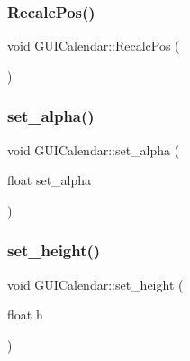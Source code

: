 \hypertarget{class_g_u_i_calendar_ac1678b2d98311a54578745c173868b72}{}\label{class_g_u_i_calendar_ac1678b2d98311a54578745c173868b72} 
\subsubsection{\texorpdfstring{Recalc\+Pos()}{RecalcPos()}}
{\footnotesize\ttfamily void G\+U\+I\+Calendar\+::\+Recalc\+Pos (\begin{DoxyParamCaption}{ }\end{DoxyParamCaption})}

\hypertarget{class_g_u_i_calendar_afe9ab4803b0d929a3b8b92214b99a952}{}\label{class_g_u_i_calendar_afe9ab4803b0d929a3b8b92214b99a952} 
\subsubsection{\texorpdfstring{set\+\_\+alpha()}{set\_alpha()}}
{\footnotesize\ttfamily void G\+U\+I\+Calendar\+::set\+\_\+alpha (\begin{DoxyParamCaption}\item[{float}]{set\+\_\+alpha }\end{DoxyParamCaption})}

\hypertarget{class_g_u_i_calendar_a7788bc4ef045da50547cf831fc8e6b51}{}\label{class_g_u_i_calendar_a7788bc4ef045da50547cf831fc8e6b51} 
\subsubsection{\texorpdfstring{set\+\_\+height()}{set\_height()}}
{\footnotesize\ttfamily void G\+U\+I\+Calendar\+::set\+\_\+height (\begin{DoxyParamCaption}\item[{float}]{h }\end{DoxyParamCaption})}

\hypertarget{class_g_u_i_calendar_a18df1a21c9f68e8e3bb0be37e5ac5bf9}{}\label{class_g_u_i_calendar_a18df1a21c9f68e8e3bb0be37e5ac5bf9} 
